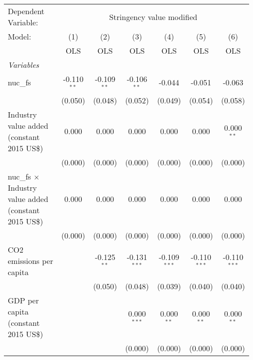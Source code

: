 
\begingroup
\centering
\begin{tabular}{lcccccc}
   \toprule
   Dependent Variable: & \multicolumn{6}{c}{Stringency value modified}\\
   Model:                                                        & (1)           & (2)           & (3)            & (4)            & (5)            & (6)\\  
                                                                 &  OLS          & OLS           & OLS            & OLS            & OLS            & OLS\\  
   \midrule
   \emph{Variables}\\
   nuc\_fs                                                       & -0.110$^{**}$ & -0.109$^{**}$ & -0.106$^{**}$  & -0.044         & -0.051         & -0.063\\   
                                                                 & (0.050)       & (0.048)       & (0.052)        & (0.049)        & (0.054)        & (0.058)\\   
   Industry value added (constant 2015 US\$)                     & 0.000         & 0.000         & 0.000          & 0.000          & 0.000          & 0.000$^{**}$\\   
                                                                 & (0.000)       & (0.000)       & (0.000)        & (0.000)        & (0.000)        & (0.000)\\   
   nuc\_fs $\times$ Industry value added (constant 2015 US\$)    & 0.000         & 0.000         & 0.000          & 0.000          & 0.000          & 0.000\\   
                                                                 & (0.000)       & (0.000)       & (0.000)        & (0.000)        & (0.000)        & (0.000)\\   
   CO2 emissions per capita                                      &               & -0.125$^{**}$ & -0.131$^{***}$ & -0.109$^{***}$ & -0.110$^{***}$ & -0.110$^{***}$\\   
                                                                 &               & (0.050)       & (0.048)        & (0.039)        & (0.040)        & (0.040)\\   
   GDP per capita (constant 2015 US\$)                           &               &               & 0.000$^{***}$  & 0.000$^{**}$   & 0.000$^{**}$   & 0.000$^{**}$\\   
                                                                 &               &               & (0.000)        & (0.000)        & (0.000)        & (0.000)\\   

\end{tabular}
